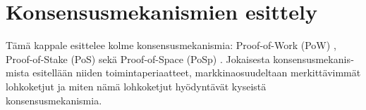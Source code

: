 \chapter{Konsensusmekanismien esittely\label{esittely}}
\begin{otherlanguage}{english}

Tämä kappale esittelee kolme konsensusmekanismia: Proof-of-Work (PoW) \cite{blockchain1}, Proof-of-Stake (PoS) \cite{pos1} sekä Proof-of-Space (PoSp) \cite{posp2}. Jokaisesta konsensusmekanismista esitellään niiden toimintaperiaatteet, markkinaosuudeltaan merkittävimmät lohkoketjut ja miten nämä lohkoketjut hyödyntävät kyseistä konsensusmekanismia.




\end{otherlanguage}
